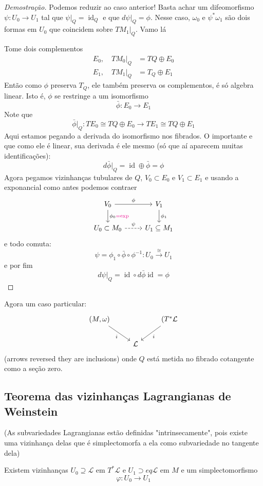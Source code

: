 \begin{proof}[Demostra\c c\~ao]
	Podemos reduzir ao caso anterior! Basta achar um difeomorfismo $\psi:U_0\to U_1$ tal que $\psi|_{Q}=\operatorname{id}_Q$ e que $d\psi|_{Q}=\phi$. Nesse caso, $\omega_0$ e $\psi^*\omega_1$ s\~ao dois formas em $U_0$ que coincidem sobre $TM_1|_{Q}$. Vamo l\'a

	Tome dois complementos
	 \begin{align*}
		E_0,\quad TM_0|_{Q}&=TQ\oplus E_0\\
		E_1,\quad TM_1|_{Q}&=T_Q\oplus E_1
	\end{align*}
	Ent\~ao como $\phi$ preserva $T_Q$, ele tamb\'em preserva os complementos, \'e s\'o algebra linear. Isto \'e, $\phi$ se restringe a um isomorfismo
	\[\bar{\phi} :E_0\to E_1\]
	Note que
	\[ \bar{\phi}|_{Q} :TE_0\cong TQ\oplus E_0\to TE_1\cong TQ\oplus E_1\]
	Aqui estamos pegando a derivada do isomorfismo nos fibrados. O importante e que como ele \'e linear, sua derivada \'e ele mesmo (s\'o que a\'i aparecem muitas identifica\c c\~oes):
	\[d\bar{\phi}|_{Q}=\operatorname{id}\oplus \bar{\phi} =\phi\]
Agora pegamos vizinhanças tubulares de $Q$, $V_0\subset E_0$ e $V_1\subset E_1$ e usando a exponancial como antes podemos contraer
\[\begin{tikzcd}
	V_0\arrow[r,"\phi"]\arrow[d,"\phi_0{\color{magenta}= \operatorname{exp}}"]&V_1\arrow[d,"\phi_1"]\\
	U_0\subset M_0\arrow[r,"\psi",dashed]&U_1\subseteq M_1
\end{tikzcd}\]
e todo comuta:
\[\psi=\phi_1\circ \bar{\phi} \circ \phi^{-1}:U_0\overset{\cong }{\longrightarrow} U_1\]
e por fim
\[d\psi|_{Q}=\operatorname{id}\circ d \bar{\phi} \operatorname{id}=\phi\]
\end{proof}

Agora um caso particular:
\[\begin{tikzcd}
	(M,\omega)\arrow[dr,"i",swap]&&(T^*\mathcal{L}\arrow[dl,"i"]\\
&\mathcal{L}
\end{tikzcd}\]
(arrows reversed they are inclusions) onde $Q$ est\'a metida no fibrado cotangente como a se\c c\~ao zero.

\subsection{Teorema das vizinhanças Lagrangianas de Weinstein}


\begin{thm}\leavevmode
	(As subvariedades Lagrangianas est\~ao definidas "intrinsecamente", pois existe uma vizinhança delas que \'e simplectomorfa a ela como subvariedade no tangente dela)

	Existem vizinhanças $U_0\supseteq \mathcal{L}$ em $T^*\mathcal{L}$ e $U_1\supset eq \mathcal{L}$ em $M$ e um simplectomorfismo
	\[\varphi:U_0\to U_1\]
\end{thm}

